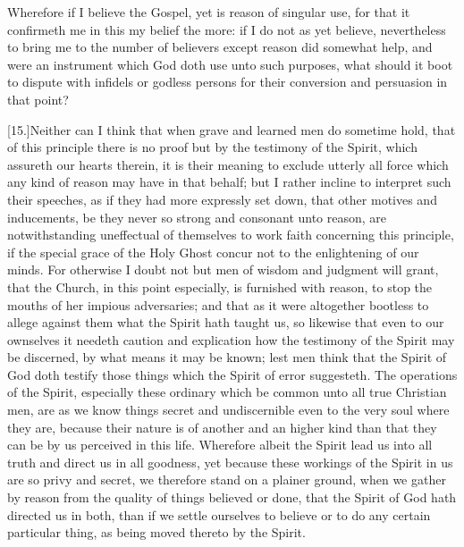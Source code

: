 Wherefore if I believe the Gospel, yet is reason of singular use, for that it confirmeth me in this my belief the more: if I do not as yet believe, nevertheless to bring me to the number of believers except reason did somewhat help, and were an instrument which God doth use unto such purposes, what should it boot to dispute with infidels or godless persons for their conversion and persuasion in that point?

[15.]Neither can I think that when grave and learned men do sometime hold, that of this principle there is no proof but by the testimony of the Spirit, which assureth our hearts therein, it is their meaning to exclude utterly all force which any kind of reason may have in that behalf; but I rather incline to interpret such their speeches, as if they had more expressly set down, that other motives and inducements, be they never so strong and consonant unto reason, are notwithstanding uneffectual of themselves to work faith concerning this principle, if the special grace of the Holy Ghost concur not to the enlightening of our minds. For otherwise I doubt not but men of wisdom and judgment will grant, that the Church, in this point especially, is furnished with reason, to stop the mouths of her impious adversaries; and that as it were altogether bootless to allege against them what the Spirit hath taught us, so likewise that even to our ownselves it needeth caution and explication how the testimony of the Spirit may be discerned, by what means it may be known; lest men think that the Spirit of God doth testify those things  which the Spirit of error suggesteth. The operations of the Spirit, especially these ordinary which be common unto all true Christian men, are as we know things secret and undiscernible even to the very soul where they are, because their nature is of another and an higher kind than that they can be by us perceived in this life. Wherefore albeit the Spirit lead us into all truth and direct us in all goodness, yet because these workings of the Spirit in us are so privy and secret, we therefore stand on a plainer ground, when we gather by reason from the quality of things believed or done, that the Spirit of God hath directed us in both, than if we settle ourselves to believe or to do any certain particular thing, as being moved thereto by the Spirit.

